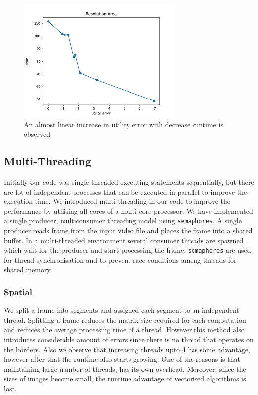 \documentclass[conference]{IEEEtran}
\begin{document}
\begin{figure}[htbp]
\centerline{\includegraphics{plots/plot_resolution_eVt.png}}
\caption{An almost linear increase in utility error with decrease runtime is observed}
\label{res_evt} 
\end{figure}
    

\subsection{Multi-Threading}
Initially our code was single threaded executing statements sequentially, but there are lot of independent processes that can be executed in parallel to improve the execution time.
We introduced multi threading in our code to improve the performance by utilising all cores of a multi-core processor. We have implemented a single producer, multiconsumer threading model using \verb|semaphores|.
A single producer reads frame from the input video file and places the frame into a shared buffer. In a multi-threaded environment several consumer threads are spawned which wait for the
producer and start processing the frame. \verb|semaphores| are used for thread synchronisation and to prevent race conditions among threads for shared memory.

\subsubsection{Spatial} 
We split a frame into segments and assigned each segment to an independent thread. Splitting a frame reduces the matrix size required for each computation and reduces the
average processing time of a thread. However this method also introduces considerable amount of errors since there is no thread that operates on the borders.
Also we observe that increasing threads upto 4 has some advantage, however after that the runtime also starts growing. One of the reasons is that maintaining large number of threads,
has its own overhead. Moreover, since the sizes of images become small, the runtime advantage of vectorised algorithms is lost.
\end{document}
